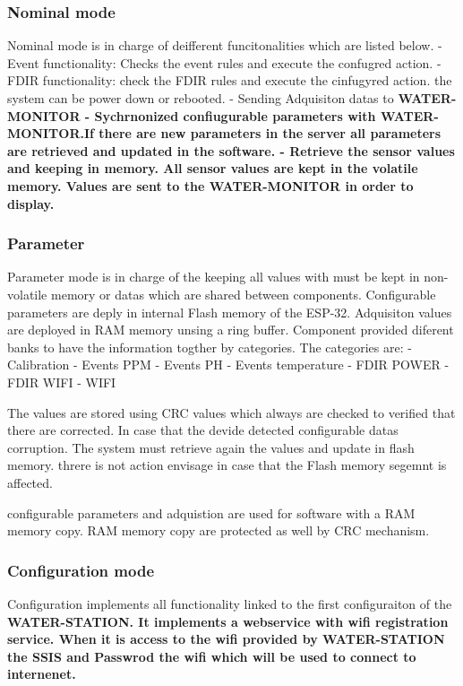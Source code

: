 \subsubsection{Nominal mode}
Nominal mode is in charge of deifferent funcitonalities which are listed below.
- Event functionality: Checks the event rules and execute the confugred action.
- FDIR functionality: check the FDIR rules and execute the cinfugyred action. the system can be power down or rebooted.
- Sending Adquisiton datas to \bf{WATER-MONITOR}
- Sychrnonized confiugurable parameters with \bf{WATER-MONITOR}.If there are new parameters in the server all parameters are retrieved and updated in the software.
- Retrieve the sensor values and keeping in memory. All sensor values are kept in the volatile memory. Values are sent to the  \bf{WATER-MONITOR} in order to display.
\subsubsection{Parameter}
Parameter mode is in charge of the keeping all values with must be kept in non-volatile memory or datas which are shared between components. Configurable parameters are deply in internal Flash memory of the ESP-32. Adquisiton values are deployed in RAM memory unsing a ring buffer.
Component provided diferent banks to have the information togther by categories. The categories are:
- Calibration
- Events PPM
- Events PH
- Events temperature
- FDIR POWER
- FDIR WIFI
- WIFI

The values are stored using CRC values which always are checked to verified that there are corrected. In case that the devide detected configurable datas corruption. The system must retrieve again the values and update in flash memory. threre is not action envisage in case that the Flash memory segemnt is affected.

configurable parameters and adquistion are used for software with a RAM memory copy. RAM memory copy are protected as well by CRC mechanism.

\subsubsection{Configuration mode}
Configuration implements all functionality linked to the first configuraiton of the \bf{WATER-STATION}. It implements a webservice with wifi registration service. When it is access to the wifi provided by \bf{WATER-STATION} the SSIS and Passwrod the wifi which will be used to connect to internenet.  










